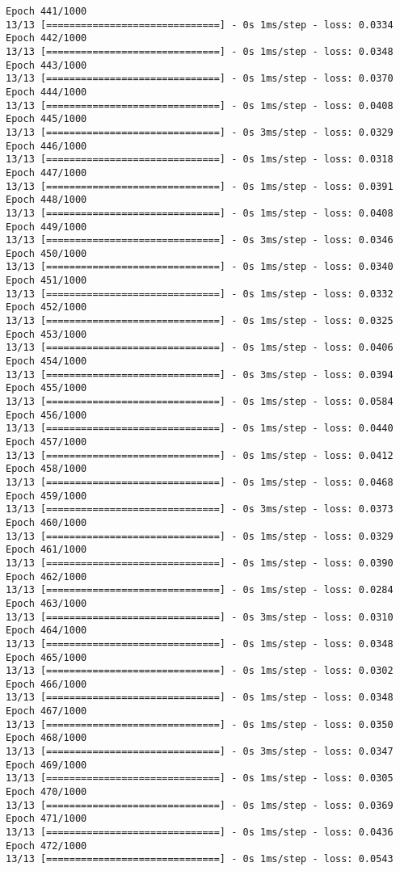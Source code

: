 \documentclass[11pt]{article}
\begin{document}
\begin{Verbatim}[commandchars=\\\{\}]
Epoch 441/1000
13/13 [==============================] - 0s 1ms/step - loss: 0.0334
Epoch 442/1000
13/13 [==============================] - 0s 1ms/step - loss: 0.0348
Epoch 443/1000
13/13 [==============================] - 0s 1ms/step - loss: 0.0370
Epoch 444/1000
13/13 [==============================] - 0s 1ms/step - loss: 0.0408
Epoch 445/1000
13/13 [==============================] - 0s 3ms/step - loss: 0.0329
Epoch 446/1000
13/13 [==============================] - 0s 1ms/step - loss: 0.0318
Epoch 447/1000
13/13 [==============================] - 0s 1ms/step - loss: 0.0391
Epoch 448/1000
13/13 [==============================] - 0s 1ms/step - loss: 0.0408
Epoch 449/1000
13/13 [==============================] - 0s 3ms/step - loss: 0.0346
Epoch 450/1000
13/13 [==============================] - 0s 1ms/step - loss: 0.0340
Epoch 451/1000
13/13 [==============================] - 0s 1ms/step - loss: 0.0332
Epoch 452/1000
13/13 [==============================] - 0s 1ms/step - loss: 0.0325
Epoch 453/1000
13/13 [==============================] - 0s 1ms/step - loss: 0.0406
Epoch 454/1000
13/13 [==============================] - 0s 3ms/step - loss: 0.0394
Epoch 455/1000
13/13 [==============================] - 0s 1ms/step - loss: 0.0584
Epoch 456/1000
13/13 [==============================] - 0s 1ms/step - loss: 0.0440
Epoch 457/1000
13/13 [==============================] - 0s 1ms/step - loss: 0.0412
Epoch 458/1000
13/13 [==============================] - 0s 1ms/step - loss: 0.0468
Epoch 459/1000
13/13 [==============================] - 0s 3ms/step - loss: 0.0373
Epoch 460/1000
13/13 [==============================] - 0s 1ms/step - loss: 0.0329
Epoch 461/1000
13/13 [==============================] - 0s 1ms/step - loss: 0.0390
Epoch 462/1000
13/13 [==============================] - 0s 1ms/step - loss: 0.0284
Epoch 463/1000
13/13 [==============================] - 0s 3ms/step - loss: 0.0310
Epoch 464/1000
13/13 [==============================] - 0s 1ms/step - loss: 0.0348
Epoch 465/1000
13/13 [==============================] - 0s 1ms/step - loss: 0.0302
Epoch 466/1000
13/13 [==============================] - 0s 1ms/step - loss: 0.0348
Epoch 467/1000
13/13 [==============================] - 0s 1ms/step - loss: 0.0350
Epoch 468/1000
13/13 [==============================] - 0s 3ms/step - loss: 0.0347
Epoch 469/1000
13/13 [==============================] - 0s 1ms/step - loss: 0.0305
Epoch 470/1000
13/13 [==============================] - 0s 1ms/step - loss: 0.0369
Epoch 471/1000
13/13 [==============================] - 0s 1ms/step - loss: 0.0436
Epoch 472/1000
13/13 [==============================] - 0s 1ms/step - loss: 0.0543

\end{Verbatim}
\end{document}
